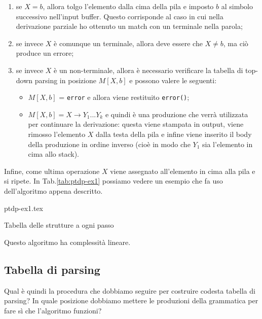 \documentclass[class=book, crop=false, oneside, 12pt]{standalone}
\begin{document}
\begin{enumerate}
    \item se \(X = b\), allora tolgo l'elemento dalla cima della pila e imposto \(b\) al simbolo successivo nell'input buffer. Questo corrisponde al caso in cui nella derivazione parziale ho ottenuto un match con un terminale nella parola;
    \item se invece \(X\) è comunque un terminale, allora deve essere che \(X \neq b\), ma ciò produce un errore;
    \item se invece \(X\) è un non-terminale, allora è necessario verificare la tabella di top-down parsing in posizione \(M[X, b]\) e possono valere le seguenti:
    \begin{itemize}
        \item \(M[X, b]\) = \texttt{error} e allora viene restituito \texttt{error()};
        \item \(M[X, b] = X \rightarrow Y_1...Y_k\) e quindi è una produzione che verrà utilizzata per continuare la derivazione: questa viene stampata in output, viene rimosso l'elemento \(X\) dalla testa della pila e infine viene inserito il body della produzione in ordine inverso (cioè in modo che \(Y_1\) sia l'elemento in cima allo stack).
    \end{itemize}
\end{enumerate}

Infine, come ultima operazione \(X\) viene assegnato all'elemento in cima alla pila e si ripete. In Tab.\ref{tab:ptdp-ex1} possiamo vedere un esempio che fa uso dell'algoritmo appena descritto.
\begin{table}[H]
	\centering
	{ptdp-ex1.tex}
    \caption{Tabella delle strutture a ogni passo}
    \label{tab:ptdp-ex1}
\end{table} 
Questo algoritmo ha complessità lineare.

\subsection{Tabella di parsing}
Qual è quindi la procedura che dobbiamo seguire per costruire codesta tabella di parsing? In quale posizione dobbiamo mettere le produzioni della grammatica per fare sì che l'algoritmo funzioni?
\end{document}
